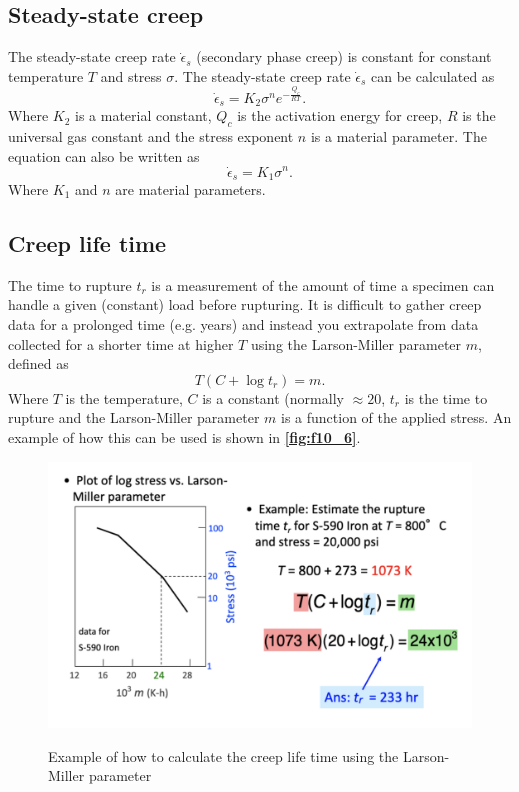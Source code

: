 \subsection{Steady-state creep}
The steady-state creep rate $\dot{\epsilon}_s$ (secondary phase creep) is constant for constant temperature $T$ and stress $\sigma$. The steady-state creep rate $\dot{\epsilon}_s$ can be calculated as
\[ 
\dot{\epsilon}_s = K_2 \sigma^{n} e^{-\frac{Q_c}{RT}}
.\]
Where $K_2$ is a material constant, $Q_c$ is the activation energy for creep, $R$ is the universal gas constant and the stress exponent $n$ is a material parameter. The equation can also be written as
\[ 
\dot{\epsilon}_s = K_1 \sigma^{n}
.\]
Where $K_1$ and $n$ are material parameters.


\subsection{Creep life time}
The time to rupture $t_r$ is a measurement of the amount of time a specimen can handle a given (constant) load before rupturing. It is difficult to gather creep data for a prolonged time (e.g. years) and instead you extrapolate from data collected for a shorter time at higher $T$ using the Larson-Miller parameter $m$, defined as
\[ 
T \left( C + \log t_r \right) = m
.\]
Where $T$ is the temperature, $C$ is a constant (normally $\approx20$, $t_r$ is the time to rupture and the Larson-Miller parameter $m$ is a function of the applied stress. An example of how this can be used is shown in \textbf{\autoref{fig:f10_6}}.
\begin{figure} [ht]
  \centering
  \caption{Example of how to calculate the creep life time using the Larson-Miller parameter}
  \includegraphics[width=0.5\linewidth]{./figures/f10_6.png}
  \label{fig:f10_6}
\end{figure}
